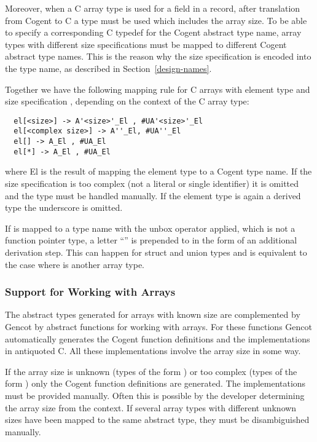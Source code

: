 Moreover, when a C array type is used for a field in a record, after translation from Cogent to C a type
must be used which includes the array size. To be able to specify a corresponding C typedef for the 
Cogent abstract type name, array types with different size specifications must be mapped to different 
Cogent abstract type names. This is the reason why the size specification is encoded into the type name,
as described in Section~\ref{design-names}. 

Together we have the following mapping rule for C arrays with element type  and size 
specification , depending on the context of the C array type:
\begin{verbatim}
  el[<size>] -> A'<size>'_El , #UA'<size>'_El
  el[<complex size>] -> A''_El, #UA''_El
  el[] -> A_El , #UA_El
  el[*] -> A_El , #UA_El
\end{verbatim}
where El is the result of mapping the element type  to a Cogent type name. If the size specification
is too complex (not a literal or single identifier) it is omitted and the type must be handled manually. If the
element type is again a derived type the underscore is omitted.

If  is mapped to a type name with the unbox operator applied, which is not a function pointer type,
a letter ``'' is prepended to  in the form of an additional derivation step. This can happen for 
struct and union types and is equivalent to the case where  is another array type.

\subsubsection{Support for Working with Arrays}

The abstract types generated for arrays with known size are complemented by Gencot by abstract functions for working with
arrays. For these functions Gencot automatically generates the Cogent function definitions and the 
implementations in antiquoted C. All these implementations involve the array size in some way.

If the array size is unknown (types of the form ) or too complex (types of the form )
only the Cogent function definitions are generated. The implementations must be provided manually. Often
this is possible by the developer determining the array size from the context. If several array types with 
different unknown sizes have been mapped to the same abstract type, they must be disambiguished manually.

